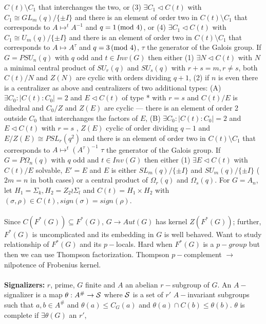 $C(t) \setminus C_1$ that interchanges the two, or 
(3) $\exists C_1 \lhd C(t)$ with $C_1 \cong GL_m(q)/\{ \pm I \}$
and there is an element of order two in
$C(t) \setminus C_1$ that corresponds to $A \mapsto ^tA^{-1}$ and $q= 1 \thinspace \textnormal{(mod } 4 \textnormal{)}$, or
(4) $\exists C_1 \lhd C(t)$ with $C_1 \cong U_m(q)/\{ \pm I \}$
and there is an element of order two in
$C(t) \setminus C_1$ that corresponds to $A \mapsto A^{\tau}$ and $q= 3 \thinspace \textnormal{(mod } 4 \textnormal{)}$, 
$\tau$ the generator of the Galois group.
If $G= PSU_{n}(q)$ with $q$ odd and $t \in Inv(G)$ then either
(1) $\exists N \lhd C(t)$ with $N$ a minimal central product of 
$SU_{r}(q)$ and
$SU_{s}(q)$ with $r+s=m, r \ne s$, both $C(t)/N$ and $Z(N)$ are cyclic with orders
dividing $q+1$, 
(2) if $n$ is even there is a centralizer as above and centralizers of two additional
types: 
(A) $\exists C_0 : |C(t):C_0|=2$ and $E \lhd C(t)$ of type * with $r=s$ and
$C(t)/E$ is dihedral and $C_0/Z$ and $Z(E)$ are cyclic --- there is an element of
order 2 outside $C_0$ that interchanges the factors of $E$,
(B) $\exists C_0 : |C(t):C_0|=2$ and $E \lhd C(t)$ with $r=s$ , $Z(E)$ cyclic of order
dividing $q-1$ and
$E/Z(E) \cong PSL_r(q^2)$ 
and there is an element of order two in
$C(t) \setminus C_1$ that corresponds to $A \mapsto ^t(A^{\tau})^{-1}$ 
$\tau$ the generator of the Galois group.
If $G= P\Omega_{n}(q)$ with $q$ odd and $t \in Inv(G)$ then either
(1) $\exists E \lhd C(t)$ with $C(t)/E$ solvable, $E'=E$ and $E$ is either
$SL_{m}(q)/ \{ \pm I \}$ and
$SU_{m}(q)/ \{ \pm I \}$  ($2m=n$ in both cases) or a central product of 
$\Omega_r(q)$ and $\Omega_s(q)$.  For $G= A_n$, let $H_1= \Sigma_k, H_2= Z_2 \wr \Sigma_l$
and $C(t) = H_1 \times H_2$ with $(\sigma, \rho) \in C(t), sign(\sigma)= sign(\rho)$.\\
\\
Since $C(F^*(G)) \subseteq F^*(G)$, $G \rightarrow Aut(G)$ has kernel $Z(F^* (G))$; 
further, $F^*(G)$ is uncomplicated and its embedding in $G$ is well behaved.  
Want to study relationship
of $F^*(G)$ and its $p-$locals.  Hard when $F^*(G)$ is a $p-group$ but then we
can use Thompson factorization.  Thompson $p-$complement
$\rightarrow$ nilpotence of Frobenius kernel.\\
\\
{\bf Signalizers:} $r$, prime, $G$ finite and $A$ an abelian $r-$subgroup of $G$. An
$A-$signalizer is a map $\theta: A^{\#} \rightarrow {\cal S}$ where ${\cal S}$ is a
set of $r'$ $A-$invariant subgroups such that $a,b \in A^{\#}$ and $\theta(a) \le C_G (a)$
and
$\theta(a) \cap C(b) \le \theta(b)$.  
$\theta$ is complete if $\exists \theta(G)$ an $r'$, 
